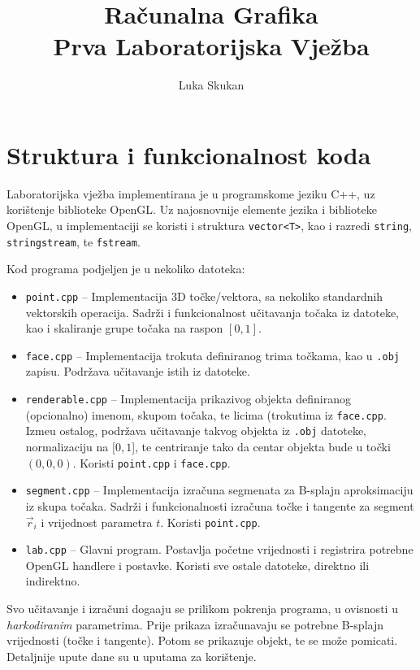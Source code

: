 \documentclass[10pt,a4paper]{article}
\author{Luka Skukan}
\title{Ra\v{c}unalna Grafika\\Prva Laboratorijska Vje\v{z}ba}
\date{}
\begin{document}
\maketitle

\section{Struktura i funkcionalnost koda}
Laboratorijska vje\v{z}ba implementirana je u programskome jeziku C++, uz kori\v{s}tenje biblioteke OpenGL. Uz najosnovnije elemente jezika i biblioteke OpenGL, u implementaciji se koristi i struktura \texttt{vector<T>}, kao i razredi \texttt{string}, \texttt{stringstream}, te \texttt{fstream}.

\noindent
Kod programa podjeljen je u nekoliko datoteka:

\begin{itemize}
    \item \texttt{point.cpp} -- Implementacija 3D to\v{c}ke/vektora, sa nekoliko standardnih vektorskih operacija. Sadr\v{z}i i funkcionalnost u\v{c}itavanja to\v{c}aka iz datoteke, kao i skaliranje grupe to\v{c}aka na raspon $[0, 1]$.
    \item \texttt{face.cpp} -- Implementacija trokuta definiranog trima to\v{c}kama, kao u \texttt{.obj} zapisu. Podr\v{z}ava u\v{c}itavanje istih iz datoteke.
    \item \texttt{renderable.cpp} -- Implementacija prikazivog objekta definiranog (opcionalno) imenom, skupom to\v{c}aka, te licima (trokutima iz \texttt{face.cpp}. Izme\dj{}u ostalog, podr\v{z}ava u\v{c}itavanje takvog objekta iz \texttt{.obj} datoteke, normalizaciju na $[0, 1$], te centriranje tako da centar objekta bude u to\v{c}ki $(0, 0, 0)$. Koristi \texttt{point.cpp} i \texttt{face.cpp}.
    \item \texttt{segment.cpp} -- Implementacija izra\v{c}una segmenata za B-splajn aproksimaciju iz skupa to\v{c}aka. Sadr\v{z}i i funkcionalnosti izra\v{c}una to\v{c}ke i tangente za segment $\vec{r}_i$ i vrijednost parametra $t$. Koristi \texttt{point.cpp}.
    \item \texttt{lab.cpp} -- Glavni program. Postavlja po\v{c}etne vrijednosti i registrira potrebne OpenGL handlere i postavke. Koristi sve ostale datoteke, direktno ili indirektno.
\end{itemize}

Svo u\v{c}itavanje i izra\v{c}uni doga\dj{}aju se prilikom pokrenja programa, u ovisnosti u \emph{harkodiranim} parametrima. Prije prikaza izra\v{c}unavaju se potrebne B-splajn vrijednosti (to\v{c}ke i tangente). Potom se prikazuje objekt, te se mo\v{z}e pomicati. Detaljnije upute dane su u uputama za kori\v{s}tenje.
\end{document}
